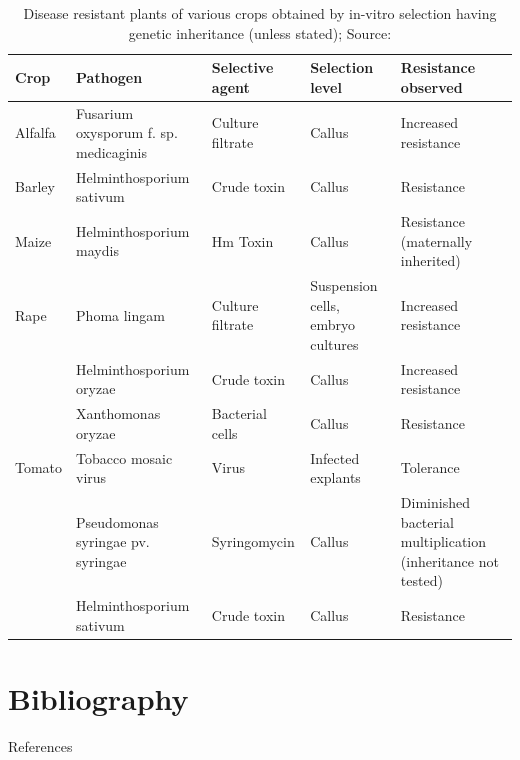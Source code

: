 \documentclass[11pt,dvipsnames,ignorenonframetext,aspectratio=169]{beamer}
\newif\ifbibliography
\begin{document}
\begin{frame}{}
\protect\hypertarget{section-3}{}
\renewcommand{\arraystretch}{0.7}

\begin{table}

\caption{\label{tab:genetic-disease-resistance-by-invitro-selection}Disease resistant plants of various crops obtained by in-vitro selection having genetic inheritance (unless stated); Source: \cite{van1991application}}
\centering
\fontsize{5}{7}\selectfont
\begin{tabular}[t]{>{\raggedright\arraybackslash}p{5em}>{\raggedright\arraybackslash}p{10em}>{\raggedright\arraybackslash}p{10em}>{\raggedright\arraybackslash}p{10em}>{\raggedright\arraybackslash}p{14em}}
\toprule
Crop & Pathogen & Selective agent & Selection level & Resistance observed\\
\midrule
Alfalfa & Fusarium oxysporum f. sp. medicaginis & Culture filtrate & Callus & Increased resistance\\
\cmidrule{1-5}
Barley & Helminthosporium sativum & Crude toxin & Callus & Resistance\\
\cmidrule{1-5}
Maize & Helminthosporium maydis & Hm Toxin & Callus & Resistance (maternally inherited)\\
\cmidrule{1-5}
Rape & Phoma lingam & Culture filtrate & Suspension cells, embryo cultures & Increased resistance\\
\cmidrule{1-5}
 & Helminthosporium oryzae & Crude toxin & Callus & Increased resistance\\
\cmidrule{2-5}
\multirow{-2}{*}{\raggedright\arraybackslash Rice} & Xanthomonas oryzae & Bacterial cells & Callus & Resistance\\
\cmidrule{1-5}
Tomato & Tobacco mosaic virus & Virus & Infected explants & Tolerance\\
\cmidrule{1-5}
 & Pseudomonas syringae pv. syringae & Syringomycin & Callus & Diminished bacterial multiplication (inheritance not tested)\\
\cmidrule{2-5}
\multirow{-2}{*}{\raggedright\arraybackslash Wheat} & Helminthosporium sativum & Crude toxin & Callus & Resistance\\
\bottomrule
\end{tabular}
\end{table}
\end{frame}

\begin{frame}{}
\protect\hypertarget{section-4}{}
\end{frame}

\hypertarget{bibliography}{%
\section{Bibliography}\label{bibliography}}

\begin{frame}{References}
\protect\hypertarget{references}{}
\end{frame}

          \begin{frame}[allowframebreaks]{}
    \bibliographytrue
    
    \end{frame}
  
\end{document}
